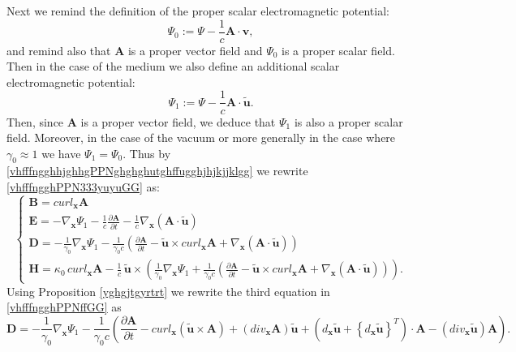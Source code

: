 \documentclass{article}
\theoremstyle{definition}
\theoremstyle{remark}
\renewcommand{\vec}[1]{\mathbf{#1}}
\newcommand{\er}{\eqref}
\newcommand{\er}{\eqref}
\begin{document}
Next we remind the definition of the proper scalar electromagnetic
potential:
\begin{equation}\label{vhfffngghhjghhgPPNghghghutghffugghjhjkjjklggkkk}
\Psi_0:=\Psi-\frac{1}{c}\vec A\cdot\vec v,
\end{equation}
and remind also that $\vec A$ is a proper vector field and $\Psi_0$
is a proper scalar field. Then in the case of the medium we also
define an additional scalar electromagnetic potential:
\begin{equation}\label{vhfffngghhjghhgPPNghghghutghffugghjhjkjjklgg}
\Psi_1:=\Psi-\frac{1}{c}\vec A\cdot\vec {\tilde u}.
\end{equation}
Then, since $\vec A$ is a proper vector field, we deduce that
$\Psi_1$ is also a proper scalar field. Moreover, in the case of the
vacuum or more generally in the case where $\gamma_0\approx 1$ we
have $\Psi_1=\Psi_0$. Thus by
\er{vhfffngghhjghhgPPNghghghutghffugghjhjkjjklgg} we rewrite
\er{vhfffngghPPN333yuyuGG} as:
\begin{equation}\label{vhfffngghPPNffGG}
\begin{cases}
\vec B= curl_{\vec x} \vec A\\
\vec E=-\nabla_{\vec x}\Psi_1-\frac{1}{c}\frac{\partial\vec
A}{\partial t}-\frac{1}{c}\nabla_{\vec x}\left(\vec A\cdot\vec
{\tilde u}\right)
\\
 \vec D=-\frac{1}{\gamma_0}\nabla_{\vec
x}\Psi_1-\frac{1}{\gamma_0 c}\left(\frac{\partial\vec A}{\partial
t}-\vec {\tilde u}\times curl_{\vec x}\vec A+\nabla_{\vec
x}\left(\vec A\cdot\vec {\tilde u}\right)\right)
\\
\vec H= \kappa_0\,curl_{\vec x} \vec A-\frac{1}{c}\,\vec {\tilde
u}\times
\left(\frac{1}{\gamma_0}\nabla_{\vec x}\Psi_1+\frac{1}{\gamma_0
c}\left(\frac{\partial\vec A}{\partial t}-\vec {\tilde u}\times
curl_{\vec x}\vec A+\nabla_{\vec x}\left(\vec A\cdot\vec {\tilde
u}\right)\right)\right).
\end{cases}
\end{equation}
Using Proposition \ref{yghgjtgyrtrt} we rewrite the third equation
in \er{vhfffngghPPNffGG} as
\begin{equation}\label{vhfffngghPPNffGG1}
\vec D=-\frac{1}{\gamma_0}\nabla_{\vec x}\Psi_1-\frac{1}{\gamma_0
c}\left(\frac{\partial\vec A}{\partial t}-curl_{\vec x}\left(\vec
{\tilde u}\times\vec A\right)+\left(div_{\vec x}\vec A\right)\vec
{\tilde u}+\left(d_{\vec x}\vec {\tilde u}+\left\{d_{\vec x}\vec
{\tilde u}\right\}^T\right)\cdot\vec A-\left(div_{\vec x}\vec
{\tilde u}\right)\vec A\right).
\end{equation}
\end{document}

